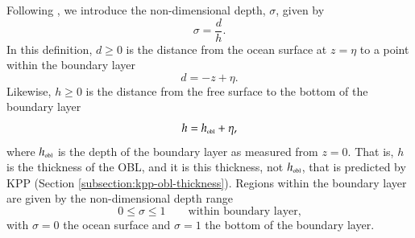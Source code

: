 Following \cite{LargeKPP}, we introduce the non-dimensional depth,
$\sigma$, given by 
\begin{equation}
  \sigma = \frac{d}{h}.
\label{eq:sigma-defined}
\end{equation}
In this definition, $d \ge 0$ is the distance from the ocean surface
at $z=\eta$ to a point within the boundary layer
\begin{equation}
  d = -z+\eta.
\label{eq:distance-from-surface-defined}
\end{equation}
Likewise, $h \ge 0$ is the distance from the free surface 
to the bottom of the boundary layer
\begin{equation}
  h = h_{\mbox{\tiny obl}} +\eta,
\label{eq:h-obl-defined}
\end{equation}
where $h_{\mbox{\tiny obl}}$ is the depth of the boundary layer as
measured from $z=0$. That is, $h$ is the thickness of the OBL, and it is this 
thickness, not $h_{\mbox{\tiny obl}}$, that is
predicted  by KPP (Section \ref{subsection:kpp-obl-thickness}).
Regions within the boundary layer are given by the non-dimensional
depth range
\begin{equation}
  0 \le \sigma \le 1 \qquad \mbox{within boundary layer,}
\end{equation}
with $\sigma=0$ the ocean surface and $\sigma = 1$ the bottom of the
boundary layer.




